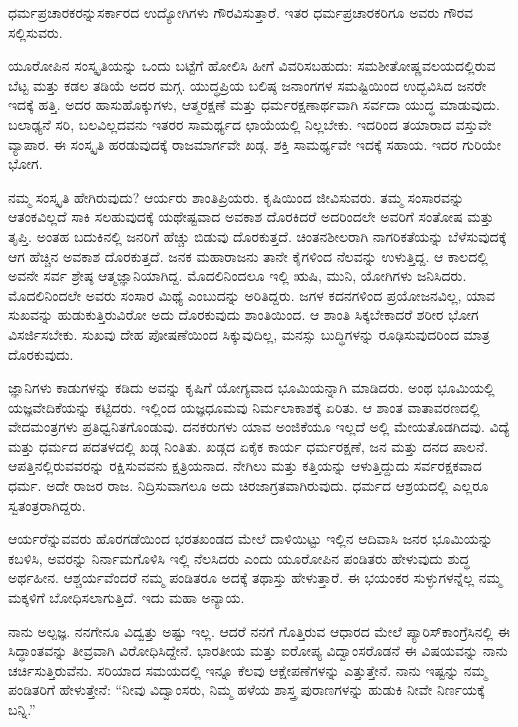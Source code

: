ಧರ್ಮಪ್ರಚಾರಕರನ್ನು\break ಸರ್ಕಾರದ ಉದ್ಯೋಗಿಗಳು ಗೌರವಿಸುತ್ತಾರೆ. ಇತರ ಧರ್ಮಪ್ರಚಾರಕರಿಗೂ ಅವರು ಗೌರವ ಸಲ್ಲಿಸುವರು.

ಯೂರೋಪಿನ ಸಂಸ್ಕೃತಿಯನ್ನು ಒಂದು ಬಟ್ಟೆಗೆ ಹೋಲಿಸಿ ಹೀಗೆ ವಿವರಿಸಬಹುದು: ಸಮಶೀತೋಷ್ಣವಲಯದಲ್ಲಿರುವ ಬೆಟ್ಟ ಮತ್ತು ಕಡಲ ತಡಿಯೆ ಅದರ ಮಗ್ಗ. ಯುದ್ಧಪ್ರಿಯ ಬಲಿಷ್ಠ ಜನಾಂಗಗಳ ಸಮಷ್ಟಿಯಿಂದ ಉದ್ಭವಿಸಿದ ಜನರೇ ಇದಕ್ಕೆ ಹತ್ತಿ. ಅದರ ಹಾಸುಹೊಕ್ಕು\break ಗಳು, ಆತ್ಮರಕ್ಷಣೆ ಮತ್ತು ಧರ್ಮರಕ್ಷಣಾರ್ಥವಾಗಿ ಸರ್ವದಾ ಯುದ್ಧ ಮಾಡುವುದು. ಬಲಾಢ್ಯನೆ ಸರಿ, ಬಲವಿಲ್ಲದವನು ಇತರರ ಸಾಮರ್ಥ್ಯದ ಛಾಯೆಯಲ್ಲಿ ನಿಲ್ಲಬೇಕು. ಇದರಿಂದ ತಯಾರಾದ ವಸ್ತುವೇ ವ್ಯಾಪಾರ. ಈ ಸಂಸ್ಕೃತಿ ಹರಡುವುದಕ್ಕೆ ರಾಜಮಾರ್ಗವೇ ಖಡ್ಗ. ಶಕ್ತಿ ಸಾಮರ್ಥ್ಯವೇ ಇದಕ್ಕೆ ಸಹಾಯ. ಇದರ ಗುರಿಯೇ ಭೋಗ.

\eject

ನಮ್ಮ ಸಂಸ್ಕೃತಿ ಹೇಗಿರುವುದು? ಆರ್ಯರು ಶಾಂತಿಪ್ರಿಯರು. ಕೃಷಿಯಿಂದ ಜೀವಿಸು\break ವರು. ತಮ್ಮ ಸಂಸಾರವನ್ನು ಆತಂಕವಿಲ್ಲದೆ ಸಾಕಿ ಸಲಹುವುದಕ್ಕೆ ಯಥೇಷ್ಟವಾದ ಅವಕಾಶ ದೊರಕಿದರೆ ಅದರಿಂದಲೇ ಅವರಿಗೆ ಸಂತೋಷ ಮತ್ತು ತೃಪ್ತಿ. ಅಂತಹ ಬದುಕಿನಲ್ಲಿ ಜನರಿಗೆ ಹೆಚ್ಚು ಬಿಡುವು ದೊರಕುತ್ತದೆ. ಚಿಂತನಶೀಲರಾಗಿ ನಾಗರಿಕತೆಯನ್ನು ಬೆಳೆಸುವುದಕ್ಕೆ ಆಗ ಹೆಚ್ಚಿನ ಅವಕಾಶ ದೊರಕುತ್ತದೆ. ಜನಕ ಮಹಾರಾಜನು ತಾನೇ ಕೈಗಳಿಂದ ನೆಲವನ್ನು ಉಳುತ್ತಿದ್ದ. ಆ ಕಾಲದಲ್ಲಿ ಅವನೇ ಸರ್ವ ಶ್ರೇಷ್ಠ ಆತ್ಮಜ್ಞಾನಿಯಾಗಿದ್ದ. ಮೊದಲಿನಿಂದಲೂ ಇಲ್ಲಿ ಋಷಿ, ಮುನಿ, ಯೋಗಿಗಳು ಜನಿಸಿದರು. ಮೊದಲಿನಿಂದಲೇ ಅವರು ಸಂಸಾರ ಮಿಥ್ಯೆ ಎಂಬುದನ್ನು ಅರಿತಿದ್ದರು. ಜಗಳ ಕದನಗಳಿಂದ ಪ್ರಯೋಜನವಿಲ್ಲ, ಯಾವ ಸುಖವನ್ನು ಹುಡುಕುತ್ತಿರುವಿರೋ ಅದು ದೊರಕುವುದು ಶಾಂತಿಯಿಂದ. ಆ ಶಾಂತಿ ಸಿಕ್ಕಬೇಕಾದರೆ ಶರೀರ ಭೋಗ ವಿಸರ್ಜಿಸಬೇಕು. ಸುಖವು ದೇಹ ಪೋಷಣೆಯಿಂದ ಸಿಕ್ಕುವುದಿಲ್ಲ, ಮನಸ್ಸು ಬುದ್ಧಿಗಳನ್ನು ರೂಢಿಸುವುದರಿಂದ ಮಾತ್ರ ದೊರಕುವುದು.

ಜ್ಞಾನಿಗಳು ಕಾಡುಗಳನ್ನು ಕಡಿದು ಅವನ್ನು ಕೃಷಿಗೆ ಯೋಗ್ಯವಾದ ಭೂಮಿಯನ್ನಾಗಿ ಮಾಡಿದರು. ಅಂಥ ಭೂಮಿಯಲ್ಲಿ ಯಜ್ಞವೇದಿಕೆಯನ್ನು ಕಟ್ಟಿದರು. ಇಲ್ಲಿಂದ ಯಜ್ಞ\break ಧೂಮವು ನಿರ್ಮಲಾಕಾಶಕ್ಕೆ ಏರಿತು. ಆ ಶಾಂತ ವಾತಾವರಣದಲ್ಲಿ ವೇದಮಂತ್ರಗಳು ಪ್ರತಿಧ್ವನಿತಗೊಂಡುವು. ದನಕರುಗಳು ಯಾವ ಅಂಜಿಕೆಯೂ ಇಲ್ಲದೆ ಅಲ್ಲಿ ಮೇಯ\break ತೊಡಗಿದವು. ವಿದ್ಯೆ ಮತ್ತು ಧರ್ಮದ ಪದತಳದಲ್ಲಿ ಖಡ್ಗ ನಿಂತಿತು. ಖಡ್ಗದ ಏಕೈಕ ಕಾರ್ಯ ಧರ್ಮರಕ್ಷಣೆ, ಜನ ಮತ್ತು ದನದ ಪಾಲನೆ. ಆಪತ್ತಿನಲ್ಲಿರುವವರನ್ನು ರಕ್ಷಿಸುವವನು ಕ್ಷತ್ರಿಯನಾದ. ನೇಗಿಲು ಮತ್ತು ಕತ್ತಿಯನ್ನು ಆಳುತ್ತಿದ್ದುದು ಸರ್ವರಕ್ಷಕವಾದ ಧರ್ಮ. ಅದೇ ರಾಜರ ರಾಜ. ನಿದ್ರಿಸುವಾಗಲೂ ಅದು ಚಿರಜಾಗ್ರತವಾಗಿರುವುದು. ಧರ್ಮದ ಆಶ್ರಯದಲ್ಲಿ ಎಲ್ಲರೂ ಸ್ವತಂತ್ರರಾಗಿದ್ದರು.

ಆರ್ಯರೆನ್ನುವವರು ಹೊರಗಡೆಯಿಂದ ಭರತಖಂಡದ ಮೇಲೆ ದಾಳಿಯಿಟ್ಟು ಇಲ್ಲಿನ ಆದಿವಾಸಿ ಜನರ ಭೂಮಿಯನ್ನು ಕಬಳಿಸಿ, ಅವರನ್ನು ನಿರ್ನಾಮಗೊಳಿಸಿ ಇಲ್ಲಿ ನೆಲಸಿದರು ಎಂದು ಯೂರೋಪಿನ ಪಂಡಿತರು ಹೇಳುವುದು ಶುದ್ಧ ಅರ್ಥಹೀನ. ಆಶ್ಚರ್ಯವೆಂದರೆ ನಮ್ಮ ಪಂಡಿತರೂ ಅದಕ್ಕೆ ತಥಾಸ್ತು ಹೇಳುತ್ತಾರೆ. ಈ ಭಯಂಕರ ಸುಳ್ಳುಗಳನ್ನೆಲ್ಲ ನಮ್ಮ ಮಕ್ಕಳಿಗೆ ಬೋಧಿಸಲಾಗುತ್ತಿದೆ. ಇದು ಮಹಾ ಅನ್ಯಾಯ.

ನಾನು ಅಲ್ಪಜ್ಞ. ನನಗೇನೂ ವಿದ್ವತ್ತು ಅಷ್ಟು ಇಲ್ಲ. ಆದರೆ ನನಗೆ ಗೊತ್ತಿರುವ ಆಧಾರದ ಮೇಲೆ ಪ್ಯಾರಿಸ್​ ಕಾಂಗ್ರೆಸಿನಲ್ಲಿ ಈ ಸಿದ್ಧಾಂತವನ್ನು ತೀವ್ರವಾಗಿ ವಿರೋಧಿಸಿದ್ದೇನೆ. ಭಾರತೀಯ ಮತ್ತು ಐರೋಪ್ಯ ವಿದ್ವಾಂಸರೊಡನೆ ಈ ವಿಷಯವನ್ನು ನಾನು ಚರ್ಚಿಸುತ್ತಿರು\break ವೆನು. ಸರಿಯಾದ ಸಮಯದಲ್ಲಿ ಇನ್ನೂ ಕೆಲವು ಆಕ್ಷೇಪಣೆಗಳನ್ನು ಎತ್ತುತ್ತೇನೆ. ನಾನು ಇಷ್ಟನ್ನು ನಮ್ಮ ಪಂಡಿತರಿಗೆ ಹೇಳುತ್ತೇನೆ: “ನೀವು ವಿದ್ವಾಂಸರು, ನಿಮ್ಮ ಹಳೆಯ ಶಾಸ್ತ್ರ ಪುರಾಣಗಳನ್ನು ಹುಡುಕಿ ನೀವೇ ನಿರ್ಣಯಕ್ಕೆ ಬನ್ನಿ.”

